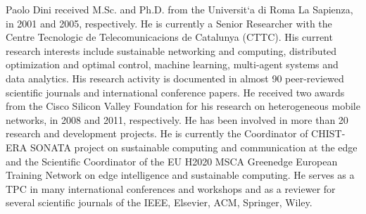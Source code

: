 \documentclass[lettersize,journal]{IEEEtran}
\begin{document}
\vspace{-1cm}
\begin{IEEEbiography}{Paolo Dini} received M.Sc. and Ph.D. from the Universit`a di Roma La Sapienza, in 2001 and 2005, respectively. He is currently a Senior Researcher with the Centre Tecnologic de Telecomunicacions de Catalunya (CTTC). His current research interests include sustainable networking and computing, distributed optimization and optimal control, machine learning, multi-agent systems and data analytics. His research activity is documented in almost 90 peer-reviewed scientific journals and international conference papers. He received two awards from the Cisco Silicon Valley Foundation for his research on heterogeneous mobile networks, in 2008 and 2011, respectively. He has been involved in more than 20 research and development projects. He is currently the Coordinator of CHIST-ERA SONATA project on sustainable computing and communication at the edge and the Scientific Coordinator of the EU H2020 MSCA Greenedge European Training Network on edge intelligence and sustainable computing. He serves as a TPC in many international conferences and workshops and as a reviewer for several scientific journals of the IEEE, Elsevier, ACM, Springer, Wiley.
\end{IEEEbiography}

\end{document}
